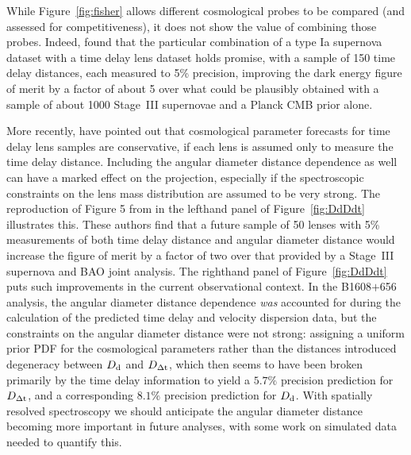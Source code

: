 While Figure~\ref{fig:fisher} allows different cosmological probes to
be compared (and assessed for competitiveness), it does not show the
value of combining those probes. Indeed, \citet{Lin11} found that the
particular combination of a type Ia supernova dataset with a time  delay
lens dataset holds promise, with a sample of 150 time delay distances,
each measured to 5\% precision, improving the dark energy figure of
merit by a factor of about 5 over what could be  plausibly obtained with
a sample of about 1000 Stage~III supernovae and a Planck CMB prior alone.

More recently, \citet{JeeKomatsuSuyu2015} have pointed out that
cosmological parameter forecasts for time delay lens samples are
conservative, if each lens is assumed only to measure the time delay
distance. Including the angular diameter distance dependence as well can
have a marked effect on the projection, especially if the spectroscopic
constraints on the lens mass distribution are assumed to be very strong.
The reproduction of Figure 5 from
\citet{JeeEtal2016} in the lefthand panel of Figure~\ref{fig:DdDdt}
illustrates this. These authors find that a future sample of
50 lenses
with 5\% measurements of both time delay distance and angular diameter
distance would increase the figure of merit by a factor of two over that
provided by a Stage~III supernova and BAO joint analysis. The righthand
panel of Figure~\ref{fig:DdDdt} puts such improvements in the  current
observational context. In the B1608$+$656 analysis, the  angular
diameter distance dependence {\it was} accounted for during the
calculation of the predicted time delay and velocity dispersion data,
but the constraints on the angular diameter distance were not strong:
assigning a uniform prior PDF for the cosmological parameters rather
than the distances introduced degeneracy between $D_{\rm d}$ and $D_{\Delta{\rm t}}$,
which then seems to have been broken primarily by the time delay
information to yield a $5.7\%$ precision prediction for $D_{\Delta{\rm t}}$, and
a corresponding $8.1\%$ precision prediction for $D_{\rm d}$.
With spatially resolved spectroscopy we should anticipate the angular
diameter distance becoming more important in future analyses, with
some work on simulated data needed to quantify this.



